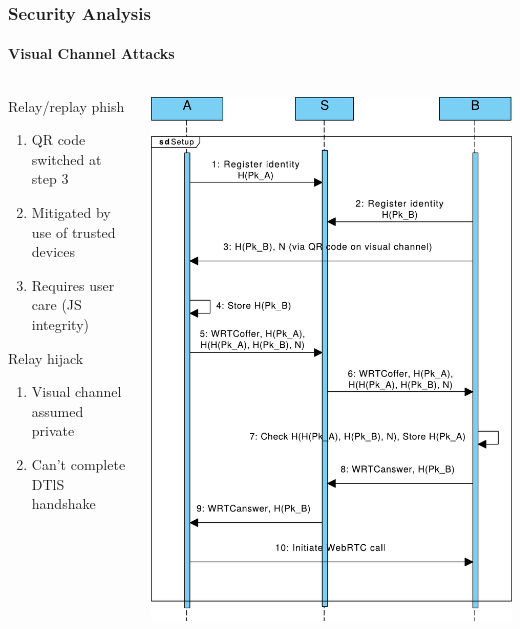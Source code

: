 \documentclass[handout, notes=show]{beamer}
\begin{document}

\begin{frame}
\frametitle{Security Analysis}
\framesubtitle{Visual Channel Attacks}

\begin{columns}[T]
\begin{column}[T]{0.6\textwidth}
\setlength{\parskip}{0.5em}

Relay/replay phish
\begin{enumerate}
\item QR code switched at step 3
\item Mitigated by use of trusted devices
\item Requires user care (JS integrity)
\end{enumerate}

Relay hijack
\begin{enumerate}
\item Visual channel assumed private
\item Can't complete DTlS handshake
\end{enumerate}

\end{column}
\begin{column}[T]{0.4\textwidth}
\includegraphics[width=1.0\textwidth]{core-qr-thin}
\end{column}
\end{columns}
\end{frame}
\end{document}
